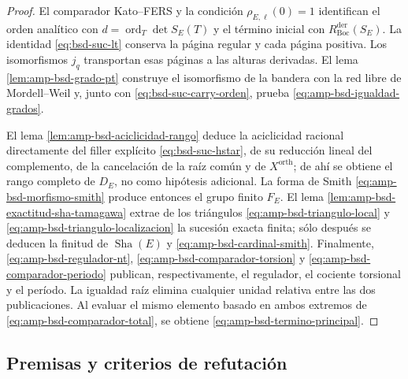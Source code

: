 \begin{proof}
El comparador Kato--FERS y la condición
\(\rho_{E,\ell}(0)=1\) identifican el orden analítico con
\(d=\operatorname{ord}_T\det S_E(T)\) y el término inicial con
\(R_{\mathrm{Boc}}^{\mathrm{der}}(S_E)\). La identidad
\eqref{eq:bsd-suc-lt} conserva la página regular y cada página positiva. Los
isomorfismos \(j_q\) transportan esas páginas a las alturas derivadas. El
lema \ref{lem:amp-bsd-grado-pt} construye el isomorfismo de la bandera con la
red libre de Mordell--Weil y, junto con
\eqref{eq:bsd-suc-carry-orden}, prueba
\eqref{eq:amp-bsd-igualdad-grados}.

El lema \ref{lem:amp-bsd-aciclicidad-rango} deduce la aciclicidad racional
directamente del filler explícito \eqref{eq:bsd-suc-hstar}, de su reducción
lineal del complemento, de la cancelación de la raíz común y de
\(X^{\mathrm{orth}}\); de ahí se obtiene el rango completo de \(D_E\), no
como hipótesis adicional. La forma de Smith
\eqref{eq:amp-bsd-morfismo-smith} produce entonces el grupo finito \(F_E\).
El lema \ref{lem:amp-bsd-exactitud-sha-tamagawa} extrae de los triángulos
\eqref{eq:amp-bsd-triangulo-local} y
\eqref{eq:amp-bsd-triangulo-localizacion} la sucesión exacta finita; sólo
después se deducen la finitud de \(\operatorname{Sha}(E)\) y
\eqref{eq:amp-bsd-cardinal-smith}. Finalmente,
\eqref{eq:amp-bsd-regulador-nt},
\eqref{eq:amp-bsd-comparador-torsion} y
\eqref{eq:amp-bsd-comparador-periodo} publican, respectivamente, el regulador,
el cociente torsional y el período. La igualdad raíz elimina cualquier unidad
relativa entre las dos publicaciones. Al evaluar el mismo elemento basado en
ambos extremos de \eqref{eq:amp-bsd-comparador-total}, se obtiene
\eqref{eq:amp-bsd-termino-principal}.
\end{proof}

\subsection{Premisas y criterios de refutación}
\label{subsec:amp-bsd-falsadores}

